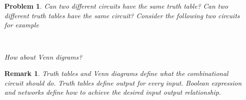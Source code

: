\documentclass{article}
\newtheorem{prob}{Problem}
\newtheorem{remark}{Remark}
\begin{document}
\begin{prob}
Can two different circuits have the same truth table? Can two different truth tables
have the same circuit? Consider the following two circuits for example \\
\noindent{}\\[1em]

\noindent{}

How about Venn digrams?
\end{prob}
\vspace{10em}

\begin{remark}
  Truth tables and Venn diagrams define \emph{what} the combinational circuit should do. Truth tables
  define output for every input.
  Boolean expression and networks define \emph{how} to achieve the desired input
  output relationship.
\end{remark}
\end{document}
